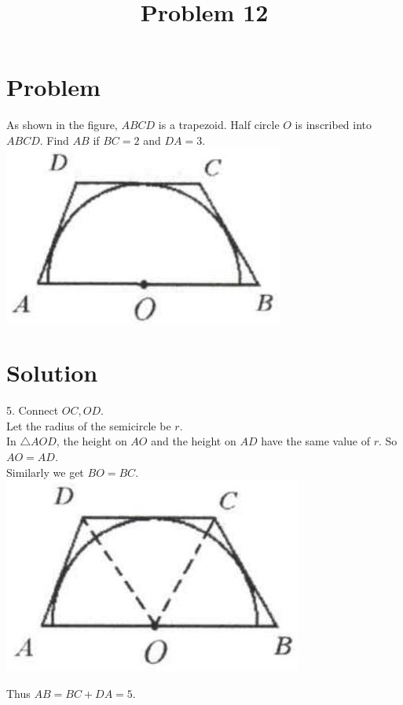 \documentclass{article}
\title{Problem 12}
\date{}
\begin{document}
\maketitle

\section*{Problem}
As shown in the figure, \(A B C D\) is a trapezoid. Half circle \(O\) is inscribed into \(A B C D\). Find \(A B\) if \(B C=2\) and \(D A=3\).\\
\centering
\includegraphics[width=\textwidth]{images/problem_image_1.jpg}

\section*{Solution}
5.
Connect \(O C, O D\).\\
Let the radius of the semicircle be \(r\).\\
In \(\triangle A O D\), the height on \(A O\) and the height on \(A D\) have the same value of \(r\). So \(A O=A D\).\\
Similarly we get \(B O=B C\).\\
\centering
\includegraphics[width=\textwidth]{images/reasoning_image_1.jpg}

Thus \(A B=B C+D A=5\).
\end{document}
